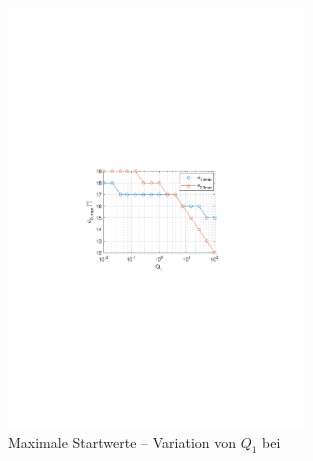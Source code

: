 \begin{figure}[htb]
	\centering
		\includegraphics[width=0.7\textwidth]{Bilder/QRVariation/ap4/q1 phi12.pdf}
		\caption{Maximale Startwerte -- Variation von $Q_1$ bei \apv}
	\label{fig:qrap4q1}
\end{figure}


